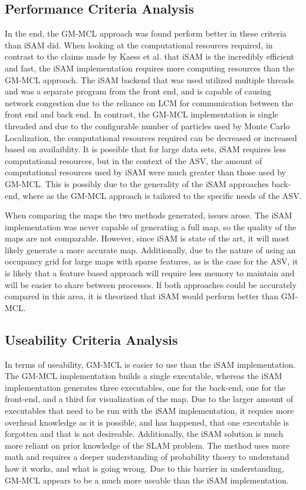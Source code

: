 \documentclass[10pt]{IEEEtran}
\begin{document}
\subsection{Performance Criteria Analysis}
In the end, the GM-MCL approach was found perform better in these criteria than iSAM did.
When looking at the computational resources required, in contrast to the claims made by 
Kaess et al. \cite{iSAM_website} that iSAM is the incredibly efficient and fast, 
the iSAM implementation requires more computing resources than the GM-MCL approach.  The 
iSAM backend that was used utilized multiple threads and
 was a separate program from the front end, and is capable of causing network congestion
due to the reliance on LCM for communication between the front end and back end.
In contrast, the GM-MCL implementation is single threaded
and due to the configurable number of particles used by Monte Carlo Localization, the 
computational resources required can be decreased or increased based on availaiblity.  It
is possible that for large data sets, iSAM requires less computational resources, but in
the context of the ASV, the amount of computational resources used by iSAM were much greater 
than those used by GM-MCL.  This is
possibly due to the generality of the iSAM approaches back-end,
where as the GM-MCL approach is tailored
to the specific needs of the ASV.

When comparing the maps the two methods generated, issues arose.  The iSAM implementation was
never capable of generating a full map, so the quality of the maps are not comparable.  
However, since iSAM is state of the art, it will most likely generate a more accurate map.
Additionally, due to the nature of using an occupancy grid for large
maps with sparse features, as is the case for the ASV, it is likely that a feature based
approach will require less memory to maintain and will be easier to share between processes. 
If both approaches could be accurately compared in this area, it is theorized that iSAM would
perform better than GM-MCL.

\subsection{Useability Criteria Analysis}
In terms of useability, GM-MCL is easier to use than the iSAM implementation.  The GM-MCL
implementation builds a single executable, whereas the iSAM implementation generates three
executables, one for the back-end, one for the front-end, and a third for visualization 
of the map.  Due to the larger amount of executables that need to be run with
the iSAM implementation, it requies more overhead knowledge as it is possible, and has happened,
that one executable is forgotten and that is not desireable.  Additionally, the iSAM solution
is much more reliant on prior knowledge of the SLAM problem.  The method uses more math and 
requires a deeper understanding of probability thoery to understand how it works, and what is
going wrong.  Due to this barrier in understanding, GM-MCL appears to be a much more useable
than the iSAM implementation.
\end{document}
